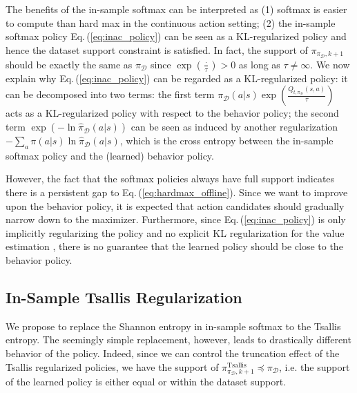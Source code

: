 \documentclass{article}
\newcommand{\AdaBracket}[1]{\left(#1\right)}
\newcommand{\eq}[1]{Eq.\,(#1)}
\newcommand{\datasetPolicy}{\pi_{\mathcal{D}}}
\begin{document}
The benefits of the in-sample softmax can be interpreted as (1) softmax is easier to compute than hard max in the continuous action setting; 
(2) the in-sample softmax policy \eq{\ref{eq:inac_policy}} can be seen as a KL-regularized policy and hence the dataset support constraint is satisfied.
In fact, the support of $ \pi_{\datasetPolicy, k+1}$ should be exactly the same as $\datasetPolicy$ since $\exp(\frac{\cdot}{\tau}) > 0$ as long as $\tau \neq \infty$.
We now explain why \eq{\ref{eq:inac_policy}} can be regarded as a KL-regularized policy: it can be decomposed into two terms:
the first term $\datasetPolicy(a|s) \exp\AdaBracket{\frac{Q_{t, \datasetPolicy}(s,a)}{\tau} }$ acts as a KL-regularized policy with respect to the behavior policy; 
the second term $\exp\AdaBracket{-\ln\hat{\pi}_{\mathcal{D}}(a|s)}$ can be seen as induced by another regularization $-\sum_{a}{\pi(a|s)}{\ln{\hat{\pi}_{\mathcal{D}}(a|s)}}$, which is the cross entropy between the in-sample softmax policy and the (learned) behavior policy.

However, the fact that the softmax policies always have full support indicates there is a persistent gap to \eq{\ref{eq:hardmax_offline}}.
Since we want to improve upon the behavior policy, it is expected that action candidates should gradually narrow down to the maximizer.
Furthermore, since \eq{\ref{eq:inac_policy}} is only implicitly regularizing the policy and no explicit KL regularization for the value estimation \cite{Wu2020-BehaviorRegularizedAC}, there is no guarantee that the learned policy should be close to the behavior policy.





\subsection{In-Sample Tsallis Regularization}

We propose to replace the Shannon entropy in in-sample softmax to the Tsallis entropy.
The seemingly simple replacement, however, leads to drastically different behavior of the policy.
Indeed, since we can control the truncation effect of the Tsallis regularized policies, we have the support of $\pi^{\text{Tsallis}}_{\datasetPolicy, k+1} \preceq \datasetPolicy$, i.e. the support of the learned policy is either equal or within the dataset support.
\end{document}
